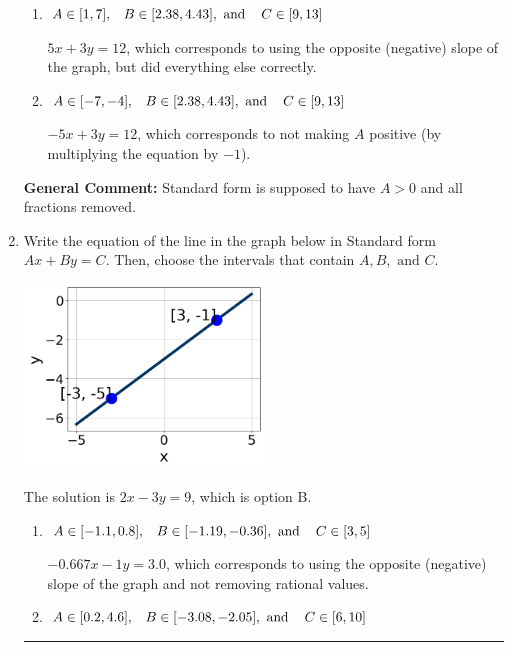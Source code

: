 \documentclass{extbook}[14pt]
\newcommand{\litem}[1]{\item #1

\rule{\textwidth}{0.4pt}}
\begin{document}
\begin{enumerate}
{\begin{enumerate}[label=\Alph*.]
 $-1.667x - 1y = -4.0$, which corresponds to using the opposite (negative) slope of the graph and not removing rational values.
\item \( A \in [1, 7], \hspace{3mm} B \in [2.38, 4.43], \text{ and } \hspace{3mm} C \in [9, 13] \)

 $5x + 3y = 12$, which corresponds to using the opposite (negative) slope of the graph, but did everything else correctly.
\item \( A \in [-7, -4], \hspace{3mm} B \in [2.38, 4.43], \text{ and } \hspace{3mm} C \in [9, 13] \)

 $-5x + 3y = 12$, which corresponds to not making $A$ positive (by multiplying the equation by $-1$).
\end{enumerate}

\textbf{General Comment:} Standard form is supposed to have $A > 0$ and all fractions removed.
}
\litem{
Write the equation of the line in the graph below in Standard form $Ax+By=C$. Then, choose the intervals that contain $A, B, \text{ and } C$.

\begin{center}
    \includegraphics[width=0.5\textwidth]{../Figures/linearGraphToStandardB.png}
\end{center}




The solution is \( 2x - 3y = 9 \), which is option B.\begin{enumerate}[label=\Alph*.]
\item \( A \in [-1.1, 0.8], \hspace{3mm} B \in [-1.19, -0.36], \text{ and } \hspace{3mm} C \in [3, 5] \)

 $-0.667x - 1y = 3.0$, which corresponds to using the opposite (negative) slope of the graph and not removing rational values.
\item \( A \in [0.2, 4.6], \hspace{3mm} B \in [-3.08, -2.05], \text{ and } \hspace{3mm} C \in [6, 10] \)


\end{enumerate}}
\end{enumerate}
\end{document}
